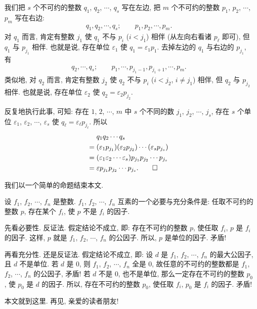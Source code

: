 \begin{pf}
    我们把 $s$ 个不可约的整数 $q_1$, $q_2$, $\cdots$, $q_s$ 写在左边, 把 $m$ 个不可约的整数 $p_1$, $p_2$, $\cdots$, $p_m$ 写在右边:
    \begin{align*}
        q_1, q_2, \cdots, q_s; \qquad p_1, p_2, \cdots, p_m.
    \end{align*}
    对 $q_1$ 而言, 肯定有整数 $j_1$ 使 $q_1$ 不与 $p_i$ ($i < j_1$) 相伴 (从左向右看诸 $p_\ell$ 即可), 但 $q_1$ 与 $p_{j_1}$ 相伴. 也就是说, 存在单位 $\varepsilon_1$ 使 $q_1 = \varepsilon_1 p_1$. 去掉左边的 $q_1$ 与右边的 $p_{j_1}$, 有
    \begin{align*}
        q_2, \cdots, q_s; \qquad p_1, \cdots, p_{j_1 - 1}, p_{j_1 + 1}, \cdots, p_m.
    \end{align*}
    类似地, 对 $q_2$ 而言, 肯定有整数 $j_2$ 使 $q_2$ 不与 $p_i$ ($i < j_2$, $i \neq j_1$) 相伴, 但 $q_2$ 与 $p_{j_2}$ 相伴. 也就是说, 存在单位 $\varepsilon_2$ 使 $q_2 = \varepsilon_2 p_{j_2}$.

    反复地执行此事, 可知: 存在 $1$, $2$, $\cdots$, $m$ 中 $s$ 个不同的数 $j_1$, $j_2$, $\cdots$, $j_s$, 存在 $s$ 个单位 $\varepsilon_1$, $\varepsilon_2$, $\cdots$, $\varepsilon_s$ 使 $q_\ell = \varepsilon_\ell p_{j_\ell}$. 所以
    \begin{align*}
             & q_1 q_2 \cdots q_s                                                                \\
        = {} & (\varepsilon_1 p_{j_1}) (\varepsilon_2 p_{j_2}) \cdots (\varepsilon_s p_{j_s})    \\
        = {} & (\varepsilon_1 \varepsilon_2 \cdots \varepsilon_s) p_{j_1} p_{j_2} \cdots p_{j_s} \\
        = {} & \varepsilon p_{j_1} p_{j_2} \cdots p_{j_s}. \qedhere
    \end{align*}
\end{pf}

我们以一个简单的命题结束本文.

\begin{proposition}
    设 $f_1$, $f_2$, $\cdots$, $f_n$ 是整数. $f_1$, $f_2$, $\cdots$, $f_n$ 互素的一个必要与充分条件是: 任取不可约的整数 $p$, 存在某个 $f_i$, 使 $p$ 不是 $f_i$ 的因子.
\end{proposition}

\begin{pf}
    先看必要性. 反证法. 假定结论不成立, 即: 存在不可约的整数 $p$, 使任取 $f_i$, $p$ 是 $f_i$ 的因子. 这样, $p$ 就是 $f_1$, $f_2$, $\cdots$, $f_n$ 的公因子. 所以, $p$ 是单位的因子. 矛盾!

    再看充分性. 还是反证法. 假定结论不成立, 即: 设 $d$ 是 $f_1$, $f_2$, $\cdots$, $f_n$ 的最大公因子, 且 $d$ 不是单位. 若 $d$ 是 $0$, 则 $f_1$, $f_2$, $\cdots$, $f_n$ 全是 $0$, 故任意的不可约的整数都是 $f_1$, $f_2$, $\cdots$, $f_n$ 的公因子, 矛盾! 若 $d$ 不是 $0$, 也不是单位, 那么一定存在不可约的整数 $p_0$, 使 $p_0$ 是 $d$ 的因子. 所以, 存在不可约的整数 $p_0$, 使任取 $f_i$, $p_0$ 是 $f_i$ 的因子. 矛盾!
\end{pf}

本文就到这里. 再见, 亲爱的读者朋友!

